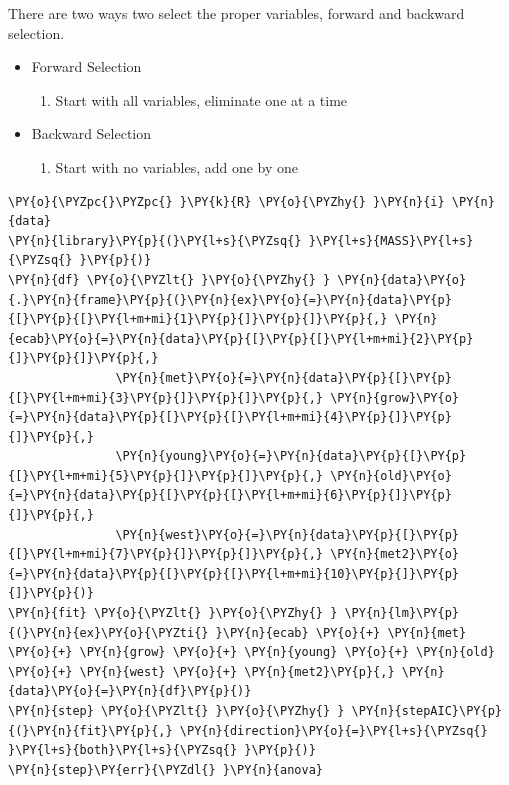 \documentclass[10pt]{article}\usepackage[]{graphicx}\usepackage[]{xcolor}
\begin{document}
There are two ways two select the proper variables, forward and backward
selection.

\begin{itemize}
\itemsep1pt\parskip0pt
\item
  Forward Selection

  \begin{enumerate}
  \def\labelenumi{\arabic{enumi}.}
  \itemsep1pt\parskip0pt
  \item
    Start with all variables, eliminate one at a time
  \end{enumerate}
\item
  Backward Selection

  \begin{enumerate}
  \def\labelenumi{\arabic{enumi}.}
  \itemsep1pt\parskip0pt
  \item
    Start with no variables, add one by one
  \end{enumerate}
\end{itemize}

    \begin{Verbatim}[commandchars=\\\{\}]
\PY{o}{\PYZpc{}\PYZpc{} }\PY{k}{R} \PY{o}{\PYZhy{} }\PY{n}{i} \PY{n}{data}
\PY{n}{library}\PY{p}{(}\PY{l+s}{\PYZsq{} }\PY{l+s}{MASS}\PY{l+s}{\PYZsq{} }\PY{p}{)}
\PY{n}{df} \PY{o}{\PYZlt{} }\PY{o}{\PYZhy{} } \PY{n}{data}\PY{o}{.}\PY{n}{frame}\PY{p}{(}\PY{n}{ex}\PY{o}{=}\PY{n}{data}\PY{p}{[}\PY{p}{[}\PY{l+m+mi}{1}\PY{p}{]}\PY{p}{]}\PY{p}{,} \PY{n}{ecab}\PY{o}{=}\PY{n}{data}\PY{p}{[}\PY{p}{[}\PY{l+m+mi}{2}\PY{p}{]}\PY{p}{]}\PY{p}{,} 
               \PY{n}{met}\PY{o}{=}\PY{n}{data}\PY{p}{[}\PY{p}{[}\PY{l+m+mi}{3}\PY{p}{]}\PY{p}{]}\PY{p}{,} \PY{n}{grow}\PY{o}{=}\PY{n}{data}\PY{p}{[}\PY{p}{[}\PY{l+m+mi}{4}\PY{p}{]}\PY{p}{]}\PY{p}{,} 
               \PY{n}{young}\PY{o}{=}\PY{n}{data}\PY{p}{[}\PY{p}{[}\PY{l+m+mi}{5}\PY{p}{]}\PY{p}{]}\PY{p}{,} \PY{n}{old}\PY{o}{=}\PY{n}{data}\PY{p}{[}\PY{p}{[}\PY{l+m+mi}{6}\PY{p}{]}\PY{p}{]}\PY{p}{,}
               \PY{n}{west}\PY{o}{=}\PY{n}{data}\PY{p}{[}\PY{p}{[}\PY{l+m+mi}{7}\PY{p}{]}\PY{p}{]}\PY{p}{,} \PY{n}{met2}\PY{o}{=}\PY{n}{data}\PY{p}{[}\PY{p}{[}\PY{l+m+mi}{10}\PY{p}{]}\PY{p}{]}\PY{p}{)}
\PY{n}{fit} \PY{o}{\PYZlt{} }\PY{o}{\PYZhy{} } \PY{n}{lm}\PY{p}{(}\PY{n}{ex}\PY{o}{\PYZti{} }\PY{n}{ecab} \PY{o}{+} \PY{n}{met} \PY{o}{+} \PY{n}{grow} \PY{o}{+} \PY{n}{young} \PY{o}{+} \PY{n}{old} \PY{o}{+} \PY{n}{west} \PY{o}{+} \PY{n}{met2}\PY{p}{,} \PY{n}{data}\PY{o}{=}\PY{n}{df}\PY{p}{)}
\PY{n}{step} \PY{o}{\PYZlt{} }\PY{o}{\PYZhy{} } \PY{n}{stepAIC}\PY{p}{(}\PY{n}{fit}\PY{p}{,} \PY{n}{direction}\PY{o}{=}\PY{l+s}{\PYZsq{} }\PY{l+s}{both}\PY{l+s}{\PYZsq{} }\PY{p}{)}
\PY{n}{step}\PY{err}{\PYZdl{} }\PY{n}{anova}
\end{Verbatim}
\end{document}
